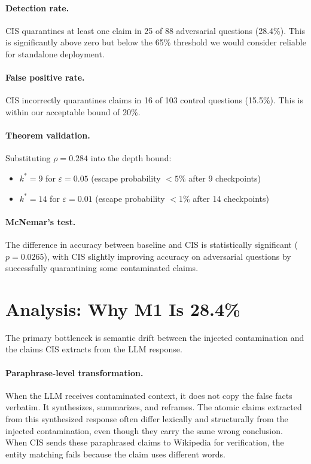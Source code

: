 \documentclass[11pt,a4paper]{article}
\begin{document}
\paragraph{Detection rate.} CIS quarantines at least one claim in 25 of 88 adversarial questions (28.4\%). This is significantly above zero but below the 65\% threshold we would consider reliable for standalone deployment.

\paragraph{False positive rate.} CIS incorrectly quarantines claims in 16 of 103 control questions (15.5\%). This is within our acceptable bound of 20\%.

\paragraph{Theorem validation.} Substituting $\rho = 0.284$ into the depth bound:
\begin{itemize}
    \item $k^* = 9$ for $\varepsilon = 0.05$ (escape probability $< 5\%$ after 9 checkpoints)
    \item $k^* = 14$ for $\varepsilon = 0.01$ (escape probability $< 1\%$ after 14 checkpoints)
\end{itemize}

\paragraph{McNemar's test.} The difference in accuracy between baseline and CIS is statistically significant ($p = 0.0265$), with CIS slightly improving accuracy on adversarial questions by successfully quarantining some contaminated claims.

\section{Analysis: Why M1 Is 28.4\%}

The primary bottleneck is semantic drift between the injected contamination and the claims CIS extracts from the LLM response.

\paragraph{Paraphrase-level transformation.} When the LLM receives contaminated context, it does not copy the false facts verbatim. It synthesizes, summarizes, and reframes. The atomic claims extracted from this synthesized response often differ lexically and structurally from the injected contamination, even though they carry the same wrong conclusion. When CIS sends these paraphrased claims to Wikipedia for verification, the entity matching fails because the claim uses different words.
\end{document}
